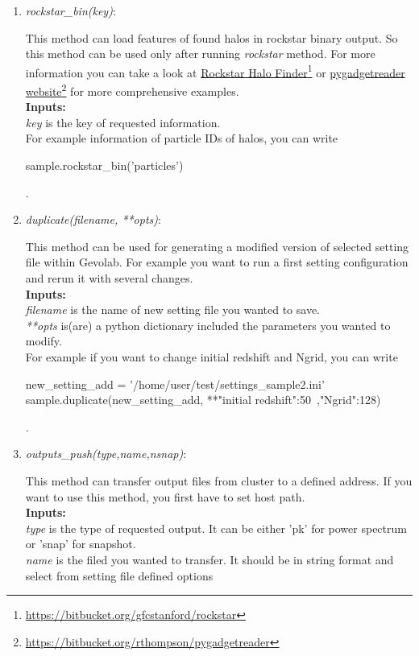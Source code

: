 \documentclass[a4paper, 12 pt]{article}
\newcommand\fnurl[2]{%
  \href{#2}{#1}\footnote{\url{#2}}%
}
\begin{document}
\begin{enumerate}
\item \textit{rockstar\_bin(key)}:

This method can load features of found halos in rockstar binary output. So this method can be used only after running \textit{rockstar} method. For more information you can take a look at \fnurl{Rockstar Halo Finder}{https://bitbucket.org/gfcstanford/rockstar}\cite{Behroozi:2011ju} or \fnurl{pygadgetreader website}{https://bitbucket.org/rthompson/pygadgetreader} for more comprehensive examples.\\

\textbf{Inputs:}\\
\textit{key} is the key of requested information.\\

For example information of particle IDs of halos, you can write
\begin{python}[language=Python, caption=rockstar bin]
sample.rockstar_bin('particles')
\end{python}.

\item \textit{duplicate(filename, **opts)}:

This method can be used for generating a modified version of selected setting file within Gevolab. For example you want to run a first setting configuration and rerun it with several changes.\\

\textbf{Inputs:}\\
\textit{filename} is the name of new setting file you wanted to save.\\
\textit{**opts} is(are) a python dictionary included the parameters you wanted to modify.\\

For example if you want to change initial redshift and Ngrid, you can write
\begin{python}[language=Python, caption=duplicate]
new_setting_add = '/home/user/test/settings_sample2.ini'
sample.duplicate(new_setting_add, **{"initial redshift":50\
,"Ngrid":128})
\end{python}.

\item \textit{outputs\_push(type,name,nsnap)}:

This method can transfer output files from cluster to a defined address. If you want to use this method, you first have to set host path.\\
\textbf{Inputs:}\\
\textit{type} is the type of requested output. It can be either 'pk' for power spectrum or 'snap' for snapshot. \\
\textit{name} is the filed you wanted to transfer. It should be in string format and select from setting file defined options \\


\end{enumerate}
\end{document}
